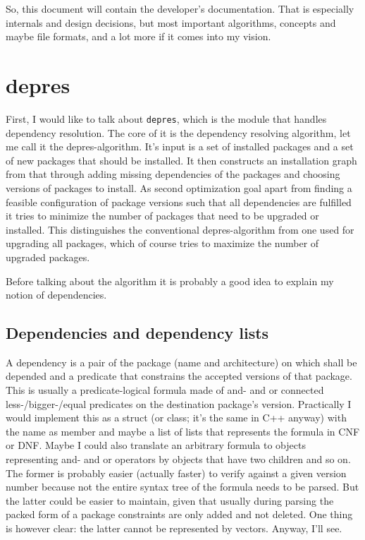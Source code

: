 \documentclass[a4paper]{scrartcl}
\newcommand{\module}[1]{\texttt{#1}}
\begin{document}
	So, this document will contain the developer's documentation. That is especially internals and design decisions, but most important algorithms, concepts and maybe file formats, and a lot more if it comes into my vision.
	
	
	\section{depres}
	\label{sec:depres}
	
	First, I would like to talk about \module{depres}, which is the module that handles dependency resolution. The core of it is the dependency resolving algorithm, let me call it the depres-algorithm. It's input is a set of installed packages and a set of new packages that should be installed. It then constructs an installation graph from that through adding missing dependencies of the packages and choosing versions of packages to install. As second optimization goal apart from finding a feasible configuration of package versions such that all dependencies are fulfilled it tries to minimize the number of packages that need to be upgraded or installed. This distinguishes the conventional depres-algorithm from one used for upgrading all packages, which of course tries to maximize the number of upgraded packages.
	
	Before talking about the algorithm it is probably a good idea to explain my notion of dependencies.
	
	
	\subsection{Dependencies and dependency lists}
	\label{ssec:dependencies_and_dependency_lists}
	
	A dependency is a pair of the package (name and architecture) on which shall be depended and a predicate that constrains the accepted versions of that package. This is usually a predicate-logical formula made of and- and or connected less-/bigger-/equal predicates on the destination package's version. Practically I would implement this as a struct (or class; it's the same in C++ anyway) with the name as member and maybe a list of lists that represents the formula in CNF or DNF. Maybe I could also translate an arbitrary formula to objects representing and- and or operators by objects that have two children and so on. The former is probably easier (actually faster) to verify against a given version number because not the entire syntax tree of the formula needs to be parsed. But the latter could be easier to maintain, given that usually during parsing the packed form of a package constraints are only added and not deleted. One thing is however clear: the latter cannot be represented by vectors. Anyway, I'll see.
	
\end{document}
